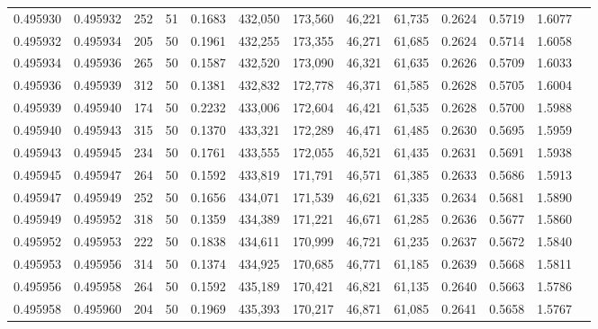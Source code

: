 \begin{tabular}{rrrrrrrrrrrrr}
0.495930 & 0.495932 &   252 &  51 &                                     0.1683 & 432,050 & 173,560 &  46,221 &  61,735 & 0.2624 & 0.5719 & 1.6077 \\
0.495932 & 0.495934 &   205 &  50 &                                     0.1961 & 432,255 & 173,355 &  46,271 &  61,685 & 0.2624 & 0.5714 & 1.6058 \\
0.495934 & 0.495936 &   265 &  50 &                                     0.1587 & 432,520 & 173,090 &  46,321 &  61,635 & 0.2626 & 0.5709 & 1.6033 \\
0.495936 & 0.495939 &   312 &  50 &                                     0.1381 & 432,832 & 172,778 &  46,371 &  61,585 & 0.2628 & 0.5705 & 1.6004 \\
0.495939 & 0.495940 &   174 &  50 &                                     0.2232 & 433,006 & 172,604 &  46,421 &  61,535 & 0.2628 & 0.5700 & 1.5988 \\
0.495940 & 0.495943 &   315 &  50 &                                     0.1370 & 433,321 & 172,289 &  46,471 &  61,485 & 0.2630 & 0.5695 & 1.5959 \\
0.495943 & 0.495945 &   234 &  50 &                                     0.1761 & 433,555 & 172,055 &  46,521 &  61,435 & 0.2631 & 0.5691 & 1.5938 \\
0.495945 & 0.495947 &   264 &  50 &                                     0.1592 & 433,819 & 171,791 &  46,571 &  61,385 & 0.2633 & 0.5686 & 1.5913 \\
0.495947 & 0.495949 &   252 &  50 &                                     0.1656 & 434,071 & 171,539 &  46,621 &  61,335 & 0.2634 & 0.5681 & 1.5890 \\
0.495949 & 0.495952 &   318 &  50 &                                     0.1359 & 434,389 & 171,221 &  46,671 &  61,285 & 0.2636 & 0.5677 & 1.5860 \\
0.495952 & 0.495953 &   222 &  50 &                                     0.1838 & 434,611 & 170,999 &  46,721 &  61,235 & 0.2637 & 0.5672 & 1.5840 \\
0.495953 & 0.495956 &   314 &  50 &                                     0.1374 & 434,925 & 170,685 &  46,771 &  61,185 & 0.2639 & 0.5668 & 1.5811 \\
0.495956 & 0.495958 &   264 &  50 &                                     0.1592 & 435,189 & 170,421 &  46,821 &  61,135 & 0.2640 & 0.5663 & 1.5786 \\
0.495958 & 0.495960 &   204 &  50 &                                     0.1969 & 435,393 & 170,217 &  46,871 &  61,085 & 0.2641 & 0.5658 & 1.5767 \\

\end{tabular}
